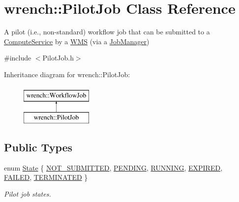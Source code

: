 \hypertarget{classwrench_1_1_pilot_job}{}\section{wrench\+:\+:Pilot\+Job Class Reference}
\label{classwrench_1_1_pilot_job}


A pilot (i.\+e., non-\/standard) workflow job that can be submitted to a \hyperlink{classwrench_1_1_compute_service}{Compute\+Service} by a \hyperlink{classwrench_1_1_w_m_s}{W\+MS} (via a \hyperlink{classwrench_1_1_job_manager}{Job\+Manager})  




{\ttfamily \#include $<$Pilot\+Job.\+h$>$}

Inheritance diagram for wrench\+:\+:Pilot\+Job\+:\begin{figure}[H]
\begin{center}
\leavevmode
\includegraphics[height=2.000000cm]{classwrench_1_1_pilot_job}
\end{center}
\end{figure}
\subsection*{Public Types}
\begin{DoxyCompactItemize}
\item 
enum \hyperlink{classwrench_1_1_pilot_job_a0540139dbc8b0a8506a87b2f55020fc8}{State} \{ \newline
\hyperlink{classwrench_1_1_pilot_job_a0540139dbc8b0a8506a87b2f55020fc8abb71dfcf76439732a0744de5ff4af302}{N\+O\+T\+\_\+\+S\+U\+B\+M\+I\+T\+T\+ED}, 
\hyperlink{classwrench_1_1_pilot_job_a0540139dbc8b0a8506a87b2f55020fc8ad580f9552e724bb04d8ce76b1577efa9}{P\+E\+N\+D\+I\+NG}, 
\hyperlink{classwrench_1_1_pilot_job_a0540139dbc8b0a8506a87b2f55020fc8a3b9c4d0ba8d77eceba1375e5a45f0f78}{R\+U\+N\+N\+I\+NG}, 
\hyperlink{classwrench_1_1_pilot_job_a0540139dbc8b0a8506a87b2f55020fc8adb2cdc68dca41bf37d4e7e2703010381}{E\+X\+P\+I\+R\+ED}, 
\newline
\hyperlink{classwrench_1_1_pilot_job_a0540139dbc8b0a8506a87b2f55020fc8ac3e5bd2baec9dd138ff1bd886b801950}{F\+A\+I\+L\+ED}, 
\hyperlink{classwrench_1_1_pilot_job_a0540139dbc8b0a8506a87b2f55020fc8a21352143c29095d065e7a042b5dc453c}{T\+E\+R\+M\+I\+N\+A\+T\+ED}
 \}\begin{DoxyCompactList}\small\item\em Pilot job states. \end{DoxyCompactList}
\end{DoxyCompactItemize}
